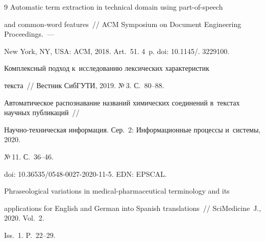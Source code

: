 {{\begin{thebibliography}{9}
 Automatic term extraction in technical domain using part-of-speech 


and common-word features~/\!\!/ ACM Symposium on Document Engineering Proceedings.~--- 


New York, NY, USA: ACM, 2018. Art.~51. 4~p. doi: 10.1145\!/. 3229100.




 Комплексный подход к~исследованию лексических характеристик  


текс\-та~/\!\!/ Вестник СибГУТИ, 2019. №\,3. С.~80--88.






 Автоматическое распознавание названий химических соединений в~текст\-ах научных пуб\-ли\-ка\-ций~/\!\!/


 На\-уч\-но-тех\-ни\-че\-ская информация. Сер.~2: Информационные процессы и~сис\-те\-мы, 2020.


№\,11. С.~36--46.


  doi: 10.36535/0548-0027-2020-11-5. EDN: EPSCAL.


 





 








 


 





 


 


 







 Phraseological variations in medical-pharmaceutical terminology and its 


applications for English and German into Spanish translations~/\!\!/ SciMedicine~J., 2020. Vol.~2. 


Iss.~1. P.~22--29.


 \end{thebibliography}


} }











